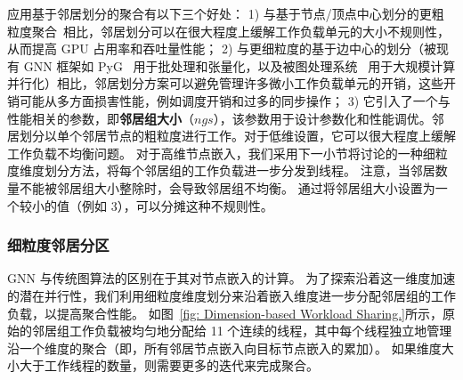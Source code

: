 应用基于邻居划分的聚合有以下三个好处：
1) 与基于节点/顶点中心划分的更粗粒度聚合~\cite{khorasani2014cusha}相比，邻居划分可以在很大程度上缓解工作负载单元的大小不规则性，从而提高 GPU 占用率和吞吐量性能；
2) 与更细粒度的基于边中心的划分（被现有 GNN 框架如 PyG~\cite{pyG} 用于批处理和张量化，以及被图处理系统~\cite{liu2019simd, wang2016gunrock} 用于大规模计算并行化）相比，邻居划分方案可以避免管理许多微小工作负载单元的开销，这些开销可能从多方面损害性能，例如调度开销和过多的同步操作；
3) 它引入了一个与性能相关的参数，即\textbf{邻居组大小}（$ngs$），该参数用于设计参数化和性能调优。邻居划分以单个邻居节点的粗粒度进行工作。对于低维设置，它可以很大程度上缓解工作负载不均衡问题。
对于高维节点嵌入，我们采用下一小节将讨论的一种细粒度维度划分方法，将每个邻居组的工作负载进一步分发到线程。
注意，当邻居数量不能被邻居组大小整除时，会导致邻居组不均衡。
通过将邻居组大小设置为一个较小的值（例如 3），可以分摊这种不规则性。


\subsubsection{细粒度邻居分区}
\label{sect: Fine-grained Dimension Partitioning}
GNN 与传统图算法的区别在于其对节点嵌入的计算。
为了探索沿着这一维度加速的潜在并行性，我们利用细粒度维度划分来沿着嵌入维度进一步分配邻居组的工作负载，以提高聚合性能。
如图~\ref{fig: Dimension-based Workload Sharing.}所示，原始的邻居组工作负载被均匀地分配给 11 个连续的线程，其中每个线程独立地管理沿一个维度的聚合（即，所有邻居节点嵌入向目标节点嵌入的累加）。
如果维度大小大于工作线程的数量，则需要更多的迭代来完成聚合。


